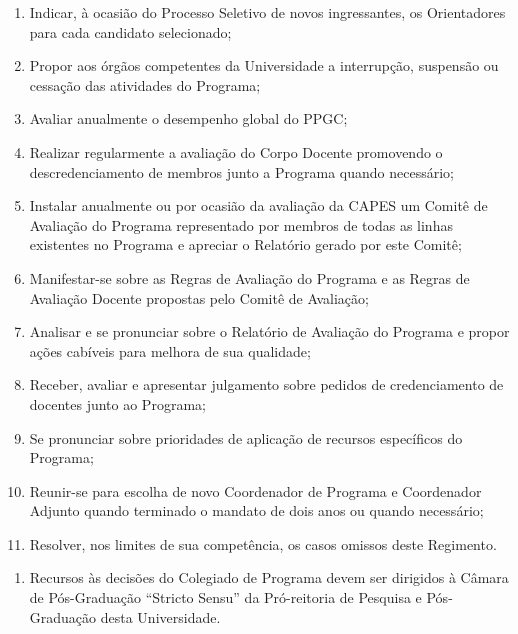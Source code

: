 \documentclass{article}
\newcommand{\singleitem}{\item[Parágrafo Único.]}
\begin{document}
\begin{enumerate}
\begin{enumerate}[label=\Roman*]
		\item Indicar, à ocasião do Processo Seletivo de novos ingressantes, os Orientadores para cada candidato selecionado; %
		\item Propor aos órgãos competentes da Universidade a interrupção, suspensão ou cessação das atividades do Programa;
		\item Avaliar anualmente o desempenho global do PPGC;
		\item Realizar regularmente a avaliação do Corpo Docente promovendo o descredenciamento de membros junto a Programa quando necessário;
		\item Instalar anualmente ou por ocasião da avaliação da CAPES um Comitê de Avaliação do Programa representado por membros de todas as linhas existentes no Programa e apreciar o Relatório gerado por este Comitê; 
		\item Manifestar-se sobre as Regras de Avaliação do Programa e as Regras de Avaliação Docente propostas pelo Comitê de Avaliação;
		\item Analisar e se pronunciar sobre o Relatório de Avaliação do Programa e propor ações cabíveis para melhora de sua qualidade;
		\item Receber, avaliar e apresentar julgamento sobre pedidos de credenciamento de docentes junto ao Programa;
		\item Se pronunciar sobre prioridades de aplicação de recursos específicos do Programa;
		\item Reunir-se para escolha de novo Coordenador de Programa e Coordenador Adjunto quando terminado o mandato de dois anos ou quando necessário; 
		\item Resolver, nos limites de sua competência, os casos omissos deste Regimento.
	\end{enumerate}
	\begin{enumerate}
		\singleitem Recursos às decisões do Colegiado de Programa devem ser dirigidos à Câmara de Pós-Graduação ``Stricto Sensu'' da Pró-reitoria de Pesquisa e Pós-Graduação desta Universidade.
	\end{enumerate}
\end{enumerate}
\end{document}
